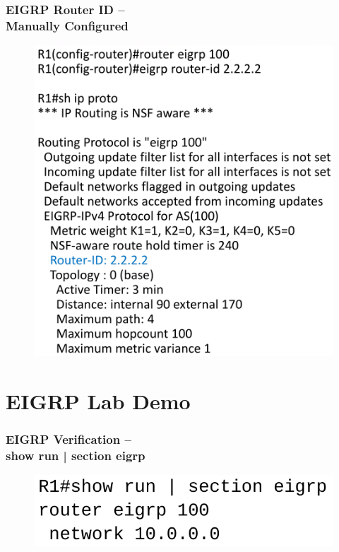 \documentclass[pdflatex,compress,mathserif]{beamer}
\begin{document}
\begin{frame}
	\frametitle{EIGRP Router ID –\\ Manually Configured}
	\begin{figure}
		\centering
		\includegraphics[height=0.8\textheight]{img/img22}
	\end{figure}
\end{frame}

\section{EIGRP Lab Demo}

\begin{frame}
	\frametitle{EIGRP Verification –\\ show run | section eigrp}
	\begin{figure}
		\centering
		\includegraphics[width=0.7\linewidth]{img/img23}
	\end{figure}
\end{frame}
\end{document}
